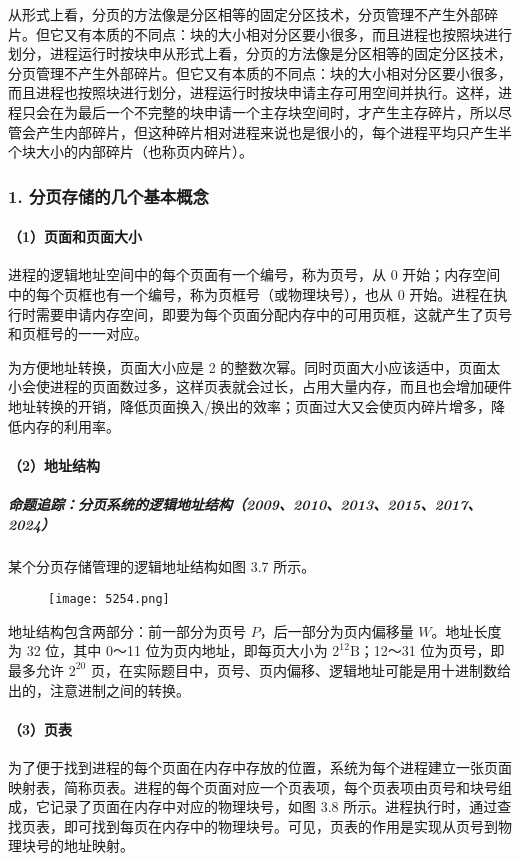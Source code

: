 \documentclass{ctexbook}
\begin{document}
	从形式上看，分页的方法像是分区相等的固定分区技术，分页管理不产生外部碎片。但它又有本质的不同点：块的大小相对分区要小很多，而且进程也按照块进行划分，进程运行时按块申从形式上看，分页的方法像是分区相等的固定分区技术，分页管理不产生外部碎片。但它又有本质的不同点：块的大小相对分区要小很多，而且进程也按照块进行划分，进程运行时按块申请主存可用空间并执行。这样，进程只会在为最后一个不完整的块申请一个主存块空间时，才产生主存碎片，所以尽管会产生内部碎片，但这种碎片相对进程来说也是很小的，每个进程平均只产生半个块大小的内部碎片（也称页内碎片）。
	
	\subsubsection{1. 分页存储的几个基本概念}
	\paragraph{（1）页面和页面大小}
	进程的逻辑地址空间中的每个页面有一个编号，称为页号，从 0 开始；内存空间中的每个页框也有一个编号，称为页框号（或物理块号），也从 0 开始。进程在执行时需要申请内存空间，即要为每个页面分配内存中的可用页框，这就产生了页号和页框号的一一对应。
	
	为方便地址转换，页面大小应是 2 的整数次幂。同时页面大小应该适中，页面太小会使进程的页面数过多，这样页表就会过长，占用大量内存，而且也会增加硬件地址转换的开销，降低页面换入/换出的效率；页面过大又会使页内碎片增多，降低内存的利用率。
	
	\paragraph{（2）地址结构}
	\subparagraph{命题追踪：分页系统的逻辑地址结构（2009、2010、2013、2015、2017、2024）}
	某个分页存储管理的逻辑地址结构如图 3.7 所示。
	
	\begin{figure}[h]
		\centering
		\texttt{[image: 5254.png]}
		\label{fig:ttttttttt}
	\end{figure}
	
	地址结构包含两部分：前一部分为页号 \( P \)，后一部分为页内偏移量 \( W \)。地址长度为 32 位，其中 0～11 位为页内地址，即每页大小为 \( 2^{12}\text{B} \)；12～31 位为页号，即最多允许 \( 2 ^ {20} \) 页，在实际题目中，页号、页内偏移、逻辑地址可能是用十进制数给出的，注意进制之间的转换。
	
	\paragraph{（3）页表}
	为了便于找到进程的每个页面在内存中存放的位置，系统为每个进程建立一张页面映射表，简称页表。进程的每个页面对应一个页表项，每个页表项由页号和块号组成，它记录了页面在内存中对应的物理块号，如图 3.8 所示。进程执行时，通过查找页表，即可找到每页在内存中的物理块号。可见，页表的作用是实现从页号到物理块号的地址映射。
	
\end{document}
